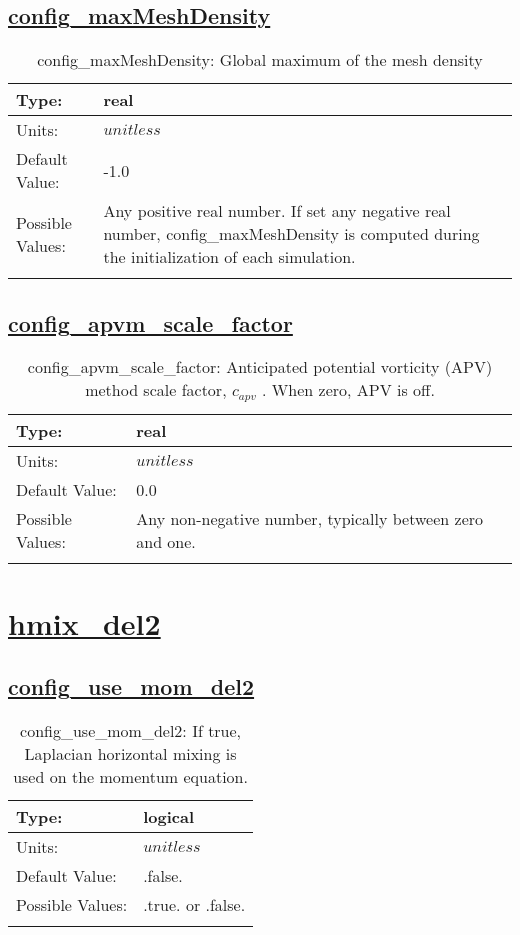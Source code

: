 \subsection[config\_maxMeshDensity]{\hyperref[sec:nm_tab_hmix]{config\_maxMeshDensity}}
\label{subsec:nm_sec_config_maxMeshDensity}
\begin{center}
\begin{longtable}{| p{2.0in} || p{4.0in} |}
    \hline
    Type: & real \\
    \hline
    Units: & $unitless$ \\
    \hline
    Default Value: & -1.0 \\
    \hline
    Possible Values: & Any positive real number. If set any negative real number, config\_maxMeshDensity is computed during the initialization of each simulation. \\
    \hline
    \caption{config\_maxMeshDensity: Global maximum of the mesh density}
\end{longtable}
\end{center}
\subsection[config\_apvm\_scale\_factor]{\hyperref[sec:nm_tab_hmix]{config\_apvm\_scale\_factor}}
\label{subsec:nm_sec_config_apvm_scale_factor}
\begin{center}
\begin{longtable}{| p{2.0in} || p{4.0in} |}
    \hline
    Type: & real \\
    \hline
    Units: & $unitless$ \\
    \hline
    Default Value: & 0.0 \\
    \hline
    Possible Values: & Any non-negative number, typically between zero and one. \\
    \hline
    \caption{config\_apvm\_scale\_factor:  Anticipated potential vorticity (APV) method scale factor,  $c_{apv}$ . When zero, APV is off.}
\end{longtable}
\end{center}
\section[hmix\_del2]{\hyperref[sec:nm_tab_hmix_del2]{hmix\_del2}}
\label{sec:nm_sec_hmix_del2}
\subsection[config\_use\_mom\_del2]{\hyperref[sec:nm_tab_hmix_del2]{config\_use\_mom\_del2}}
\label{subsec:nm_sec_config_use_mom_del2}
\begin{center}
\begin{longtable}{| p{2.0in} || p{4.0in} |}
    \hline
    Type: & logical \\
    \hline
    Units: & $unitless$ \\
    \hline
    Default Value: & .false. \\
    \hline
    Possible Values: & .true. or .false. \\
    \hline
    \caption{config\_use\_mom\_del2: If true, Laplacian horizontal mixing is used on the momentum equation.}
\end{longtable}
\end{center}
